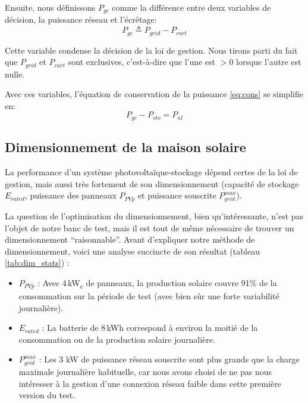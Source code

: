 \documentclass[a4paper,10pt,twocolumn]{article}
\newcommand\sub[1]{\textsubscript{#1}}
\begin{document}
Ensuite, nous définissons $P_{gc}$ comme la différence entre deux variables
de décision, la puissance réseau et l'écrêtage:
%
\begin{equation}
  P_{gc} \triangleq P_{grid} - P_{curt}
\end{equation} 

Cette variable condense la décision de la loi de gestion.
Nous tirons parti du fait que $P_{grid}$ et $P_{curt}$ sont exclusives,
c'est-à-dire que l'une est $>0$ lorsque l'autre est nulle.

Avec ces variables, l'équation de conservation de la puissance \eqref{eq:cons}
se simplifie en:
%
\begin{equation} \label{eq:cons2}
  P_{gc} - P_{sto} = P_{nl}
\end{equation}
%


\subsection{Dimensionnement de la maison solaire}
\label{ss:dimens}

La performance d'un système photovoltaïque-stockage dépend certes de la loi de gestion,
mais aussi très fortement de son dimensionnement
(capacité de stockage $E_{rated}$,
puissance des panneaux $P_{PVp}$ et 
puissance souscrite $P_{grid}^{max}$).

La question de l'optimisation du dimensionnement, bien qu'intéressante,
n'est pas l'objet de notre banc de test, mais il est tout de même nécessaire
de trouver un dimensionnement ``raisonnable''.
%
Avant d'expliquer notre méthode de dimensionnement, voici une analyse
succincte de son résultat (tableau \ref{tab:dim_stats}) :

\begin{itemize}
 \item $P_{PVp}$ : Avec 4\,kW\sub{c} de panneaux, la production solaire couvre 91\%
de la consommation sur la période de test (avec bien sûr une forte variabilité journalière).
 \item $E_{rated}$ : La batterie de 8\,kWh correspond à environ la moitié de la consommation
 ou de la production solaire journalière.
 \item $P_{grid}^{max}$ : Les 3 kW de puissance réseau souscrite sont plus grands
 que la charge maximale journalière habituelle,
 car nous avons choisi de ne pas nous intéresser à la gestion d'une connexion réseau faible
 dans cette première version du test.
\end{itemize}
\end{document}
